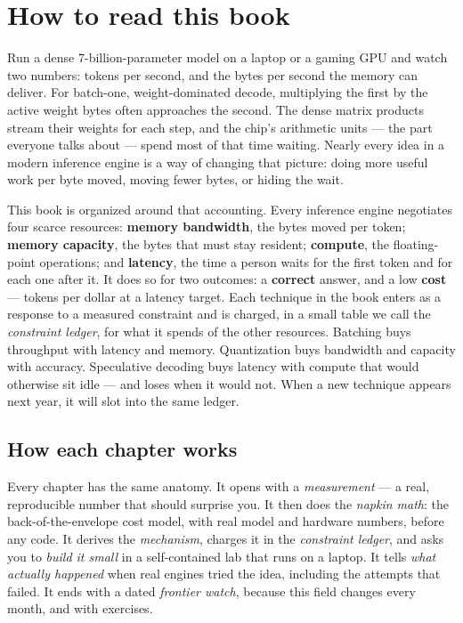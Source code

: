 \chapter*{How to read this book}

Run a dense 7-billion-parameter model on a laptop or a gaming GPU and watch two
numbers: tokens per second, and the bytes per second the memory can deliver.
For batch-one, weight-dominated decode, multiplying the first by the active
weight bytes often approaches the second. The dense matrix products stream
their weights for each step, and the chip's
arithmetic units --- the part everyone talks about --- spend most of that time
waiting. Nearly every idea in a modern inference engine is a way of changing
that picture: doing more useful work per byte moved, moving fewer bytes, or
hiding the wait.

This book is organized around that accounting. Every inference engine
negotiates four scarce resources: \textbf{memory bandwidth}, the bytes moved
per token; \textbf{memory capacity}, the bytes that must stay resident;
\textbf{compute}, the floating-point operations; and \textbf{latency}, the time
a person waits for the first token and for each one after it. It does so for
two outcomes: a \textbf{correct} answer, and a low \textbf{cost} --- tokens per
dollar at a latency target. Each technique in the book enters as a response to
a measured constraint and is charged, in a small table we call the
\emph{constraint ledger}, for what it spends of the other resources. Batching
buys throughput with latency and memory. Quantization buys bandwidth and
capacity with accuracy. Speculative decoding buys latency with compute that
would otherwise sit idle --- and loses when it would not. When a new technique
appears next year, it will slot into the same ledger.

\section*{How each chapter works}
Every chapter has the same anatomy. It opens with a \emph{measurement} ---
a real, reproducible number that should surprise you. It then does the
\emph{napkin math}: the back-of-the-envelope cost model, with real model and
hardware numbers, before any code. It derives the \emph{mechanism}, charges it
in the \emph{constraint ledger}, and asks you to \emph{build it small} in a
self-contained lab that runs on a laptop. It tells \emph{what actually
happened} when real engines tried the idea, including the attempts that failed.
It ends with a dated \emph{frontier watch}, because this field changes every
month, and with exercises.

